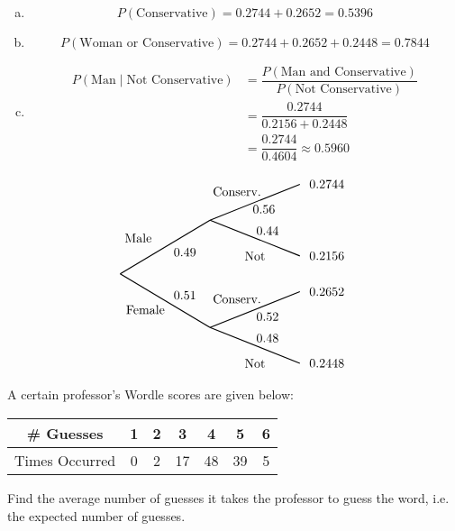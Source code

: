 \documentclass[12pt,letterpaper]{exam}
\begin{document}
\begin{questions}
\sol 
\begin{enumerate}[(a)]
\item 
	\[
	P(\text{Conservative})= 0.2744 + 0.2652= 0.5396
	\] \pspace

\item 
	\[
	P(\text{Woman or Conservative})= 0.2744 + 0.2652 + 0.2448= 0.7844
	\] \pspace

\item 
	\[
	\begin{aligned}
	P(\text{Man} \;|\; \text{Not Conservative})&= \dfrac{P(\text{Man and Conservative})}{P(\text{Not Conservative})} \\[0.3cm]
	&= \dfrac{0.2744}{0.2156 + 0.2448} \\[0.3cm]
	&= \dfrac{0.2744}{0.4604} \approx 0.5960
	\end{aligned}
	\]
\end{enumerate} \vfill

		\[
		\begin{tikzpicture}[scale= 1.0]
		\def\FirstUpLabel{Male}
		\def\FirstDownLabel{Female}
		\def\SecondUpLabel{Conserv.}
		\def\SecondDownLabel{Not}
		\def\Up{$0.49$}
		\def\Down{$0.51$}
		\def\UpUp{$0.56$}
		\def\UpDown{$0.44$}
		\def\DownUp{$0.52$}
		\def\DownDown{$0.48$}
		\def\first{$0.2744$}
		\def\second{$0.2156$}
		\def\third{$0.2652$}
		\def\fourth{$0.2448$}
		
		\node at (0.5,1) {\FirstUpLabel};	
		\node at (0.7,-1) {\FirstDownLabel};	
		\node at (1.8,0.6) {\Up};
		\node at (1.8,-0.6) {\Down};
		\draw[thick] (0,0) -- (2.5,1.5);
		\draw[thick] (0,0) -- (2.5,-1.5);
		
		\node at (3.25,2.3) {\SecondUpLabel};
		\node at (3.75,0.5) {\SecondDownLabel};
		\node at (4,1.8) {\UpUp};
		\node at (4.1,1.2) {\UpDown};
		\node at (5.75,2.5) {\first};
		\node at (5.75,0.5) {\second};
		\draw[thick] (2.5,1.5) -- (5,2.5);
		\draw[thick] (2.5,1.5) -- (5,0.5);

		\node at (3.25,-0.7) {\SecondUpLabel};
		\node at (3.75,-2.5) {\SecondDownLabel};
		\node at (4.1,-1.2) {\DownUp};
		\node at (4.1,-1.8) {\DownDown};
		\node at (5.75,-0.5) {\third};	
		\node at (5.75,-2.5) {\fourth};	
		\draw[thick] (2.5,-1.5) -- (5,-0.5);
		\draw[thick] (2.5,-1.5) -- (5,-2.5);
		\end{tikzpicture}
		\]



\newpage
\question[10] A certain professor's Wordle scores are given below: \par
	\begin{table}[h]
	\centering
	\begin{tabular}{c||cccccc}
	\# Guesses & 1 & 2 & 3 & 4 & 5 & 6 \\ \hline
	Times Occurred & 0 & 2 & 17 & 48 & 39 & 5 
	\end{tabular}
	\end{table} \par
Find the average number of guesses it takes the professor to guess the word, i.e. the expected number of guesses. \pspace


\end{questions}
\end{document}
